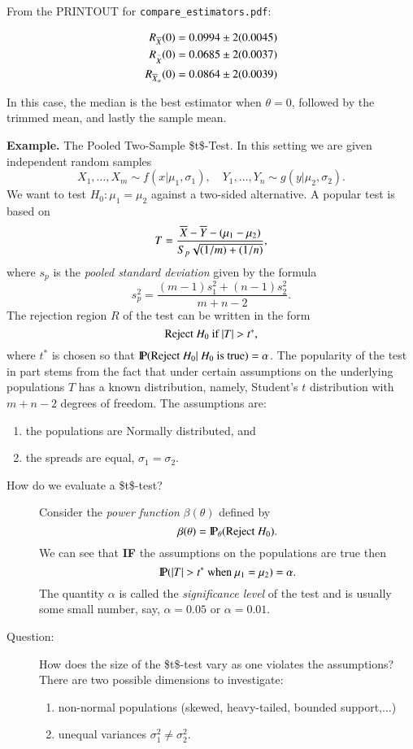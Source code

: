 \documentclass[11pt,english]{scrbook}
\begin{document}
From the PRINTOUT for \texttt{compare\_estimators.pdf}:

\begin{align*}
R_{\Xbar}(0) & = 0.0994 \pm2 (0.0045) \\
R_{\overset{\sim}{X}}(0) & = 0.0685 \pm2 (0.0037) \\
R_{\Xbar_{\alpha}}(0) & = 0.0864 \pm2 (0.0039)
\end{align*}

In this case, the median is the best estimator when \(\theta=0\), followed by the trimmed mean, and lastly the sample mean.  

\bigskip

\textbf{Example.} The Pooled Two-Sample \$t\$-Test.
In this setting we are given independent random samples
\[
X_{1},\ldots,X_{m}\sim f(x|\mu_{1},\sigma_{1}),\quad Y_{1},\ldots,Y_{n}\sim g(y|\mu_{2},\sigma_{2}).
\]
We want to test \(H_{0}:\mu_{1}=\mu_{2}\) against a two-sided alternative. A popular test is based on 
\[
T=\frac{\Xbar-\overline{Y}-(\mu_{1}-\mu_{2})}{S_{p}\sqrt{(1/m)+(1/n)}},
\]
where \(s_{p}\) is the \emph{pooled standard deviation} given by the
formula 
\[
s_{p}^{2}=\frac{(m-1)s_{1}^{2}+(n-1)s_{2}^{2}}{m+n-2}.
\]
 The rejection region \(R\) of the test can be written in the form
\[
\mbox{Reject \ensuremath{H_{0}} if \ensuremath{|T|>t^{\ast}}},
\]
where \(t^{\ast}\) is chosen so that \(\P(\mbox{Reject \ensuremath{H_{0}}}|\mbox{ \ensuremath{H_{0}} is true})=\alpha\). The popularity of the test in part stems from the fact that under certain assumptions on the underlying populations \(T\) has a known distribution, namely, Student's \(t\) distribution with \(m+n-2\) degrees of freedom. The assumptions are:
\begin{enumerate}
\item the populations are Normally distributed, and
\item the spreads are equal, \(\sigma_{1}=\sigma_{2}\).
\end{enumerate}



\begin{description}
\item[{How do we evaluate a \$t\$-test?}] Consider the \emph{power function} \(\beta(\theta)\) defined by 
\[
  \beta(\theta)=\P_{\theta}(\mbox{Reject \ensuremath{H_{0}}}).
  \]
We can see that \textbf{IF} the assumptions on the populations are true then 
\[
  \P(|T|>t^{\ast}\mbox{ when \ensuremath{\mu_{1}=\mu_{2}}})=\alpha.
  \]
The quantity \(\alpha\) is called the \emph{significance level} of the test and is usually some small number, say, \(\alpha=0.05\) or \(\alpha=0.01\).

\item[{Question:}] How does the size of the \$t\$-test vary as one violates the assumptions? There are two possible dimensions to investigate:
\begin{enumerate}
\item non-normal populations (skewed, heavy-tailed, bounded support,\(\ldots\))
\item unequal variances \(\sigma_{1}^{2}\neq\sigma_{2}^{2}\).
\end{enumerate}
\end{description}
\end{document}
